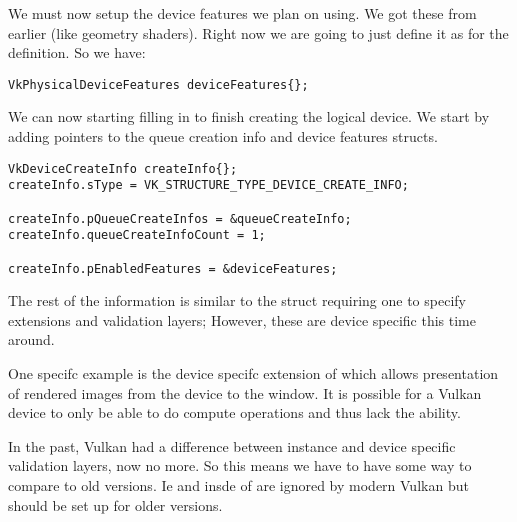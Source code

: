 \par We must now setup the device features we plan on using. We got these from  earlier (like geometry shaders). Right now we are going to just define it as  for the definition. So we have:

\begin{center}
\begin{minipage}{0.95\linewidth}
\begin{lstlisting}
VkPhysicalDeviceFeatures deviceFeatures{};
\end{lstlisting}
\end{minipage}
\end{center}

\par We can now starting filling in  to finish creating the logical device. We start by adding pointers to the queue creation info and device features structs.

\begin{center}
\begin{minipage}{0.95\linewidth}
\begin{lstlisting}
VkDeviceCreateInfo createInfo{};
createInfo.sType = VK_STRUCTURE_TYPE_DEVICE_CREATE_INFO;

createInfo.pQueueCreateInfos = &queueCreateInfo;
createInfo.queueCreateInfoCount = 1;

createInfo.pEnabledFeatures = &deviceFeatures;
\end{lstlisting}
\end{minipage}
\end{center}

\par The rest of the information is similar to the  struct requiring one to specify extensions and validation layers; However, these are device specific this time around.

\par One specifc example is the device specifc extension of  which allows presentation of rendered images from the device to the window. It is possible for a Vulkan device to only be able to do compute operations and thus lack the ability.

\par In the past, Vulkan had a difference between instance and device specific validation layers, now no more. So this means we have to have some way to compare to old versions. Ie  and  insde of  are ignored by modern Vulkan but should be set up for older versions.

